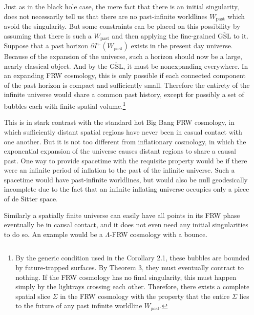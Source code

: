 \documentclass[12pt]{article}
\begin{document}
Just as in the black hole case, the mere fact that there is an initial singularity, does not necessarily tell us that there are no past-infinite worldlines $W_\mathrm{past}$ which avoid the singularity.  But some constraints can be placed on this possibility by assuming that there is such a $W_\mathrm{past}$ and then applying the fine-grained $\overline{\mathrm{GSL}}$ to it.  Suppose that a past horizon 
$\partial I^+(W_\mathrm{past})$ exists in the present day universe.  Because of the expansion of the universe, such a horizon should now be a large, nearly classical object.  And by the $\overline{\mathrm{GSL}}$, it must be nonexpanding everywhere.  In an expanding FRW cosmology, this is only possible if each connected component of the past horizon is compact and sufficiently small.  Therefore the entirety of the infinite universe would share a common past history, except for possibly a set of bubbles each with finite spatial volume.\footnote{By the generic condition used in the Corollary 2.1, these bubbles are bounded by future-trapped surfaces.  By Theorem 3, they must eventually contract to nothing.  If the FRW cosmology has no final singularity, this must happen simply by the lightrays crossing each other.  Therefore, there exists a complete spatial slice $\Sigma$ in the FRW cosmology with the property that the entire $\Sigma$ lies to the future of any past infinite worldline $W_\mathrm{past}$.}

This is in stark contrast with the standard hot Big Bang FRW cosmology, in which sufficiently distant spatial regions have never been in casual contact with one another.  But it is not too different from inflationary cosmology, in which the exponential expansion of the universe causes distant regions to share a causal past.  One way to provide spacetime with the requisite property would be if there were an infinite period of inflation to the past of the infinite universe.  Such a spacetime would have past-infinite worldlines, but would also be null geodesically incomplete due to the fact that an infinite inflating universe occupies only a piece of de Sitter space.

Similarly a spatially finite universe can easily have all points in its FRW phase eventually be in causal contact, and it does not even need any initial singularities to do so.  An example would be a $\Lambda$-FRW cosmology with a bounce.
\end{document}
